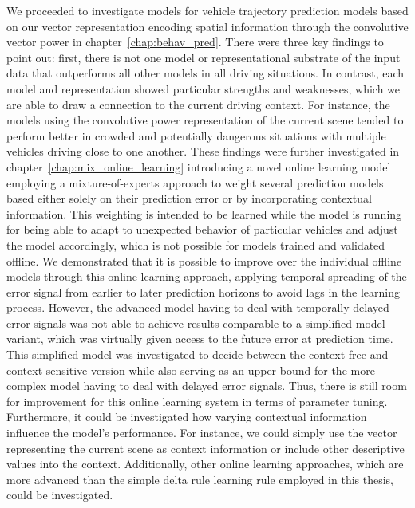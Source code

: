 We proceeded to investigate models for vehicle trajectory prediction models based on our vector representation encoding spatial information through the convolutive vector power in chapter~\ref{chap:behav_pred}.
There were three key findings to point out: first, there is not one model or representational substrate of the input data that outperforms all other models in all driving situations.
In contrast, each model and representation showed particular strengths and weaknesses, which we are able to draw a connection to the current driving context.
For instance, the models using the convolutive power representation of the current scene tended to perform better in crowded and potentially dangerous situations with multiple vehicles driving close to one another.
These findings were further investigated in chapter~\ref{chap:mix_online_learning} introducing a novel online learning model employing a mixture-of-experts approach to weight several prediction models based either solely on their prediction error or by incorporating contextual information.
This weighting is intended to be learned while the model is running for being able to adapt to unexpected behavior of particular vehicles and adjust the model accordingly, which is not possible for models trained and validated offline.
We demonstrated that it is possible to improve over the individual offline models through this online learning approach, applying temporal spreading of the error signal from earlier to later prediction horizons to avoid lags in the learning process.
However, the advanced model having to deal with temporally delayed error signals was not able to achieve results comparable to a simplified model variant, which was virtually given access to the future error at prediction time.
This simplified model was investigated to decide between the context-free and context-sensitive version while also serving as an upper bound for the more complex model having to deal with delayed error signals.
Thus, there is still room for improvement for this online learning system in terms of parameter tuning.
Furthermore, it could be investigated how varying contextual information influence the model's performance.
For instance, we could simply use the vector representing the current scene as context information or include other descriptive values into the context.
Additionally, other online learning approaches, which are more advanced than the simple delta rule learning rule employed in this thesis, could be investigated.

